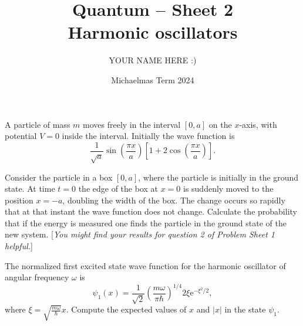 \documentclass[answers]{exam}
\title{Quantum -- Sheet 2\\Harmonic oscillators}
\author{YOUR NAME HERE :)}
\date{Michaelmas Term 2024}
\begin{document}
\maketitle

\begin{questions}

\question%
A particle of mass $m$ moves freely in the interval $[0, a]$ on the $x$-axis, with potential $V=0$ inside the interval. Initially the wave function is \[
	\frac{1}{\sqrt{a}} \sin \left(\frac{\pi x}{a}\right)\left[1+2 \cos \left(\frac{\pi x}{a}\right)\right].
\]



\question%
Consider the particle in a box $[0, a]$, where the particle is initially in the ground state. At time $t=0$ the edge of the box at $x=0$ is suddenly moved to the position $x=-a$, doubling the width of the box. The change occurs so rapidly that at that instant the wave function does not change. Calculate the probability that if the energy is measured one finds the particle in the ground state of the new system. [\emph{You might find your results for question 2 of Problem Sheet 1 helpful.}]



\question%
The normalized first excited state wave function for the harmonic oscillator of angular frequency $\omega$ is \[
	\psi_{1}(x)=\frac{1}{\sqrt{2}}\left(\frac{m \omega}{\pi \hbar}\right)^{1 / 4} 2 \xi \mathrm{e}^{-\xi^{2} / 2},
\] where $\xi=\sqrt{\frac{m \omega}{\hbar}} x$. Compute the expected values of $x$ and $|x|$ in the state $\psi_{1}$.




\end{questions}
\end{document}
